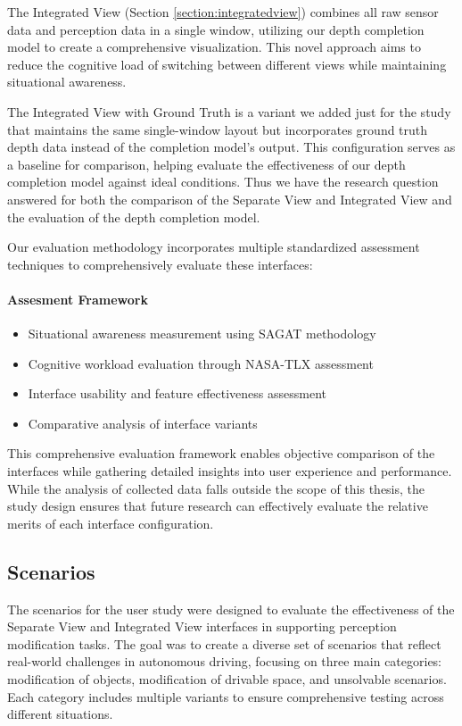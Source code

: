 The Integrated View (Section \ref{section:integratedview}) combines all raw sensor data and perception data in a single window, utilizing our depth completion model to create a comprehensive visualization. This novel approach aims to reduce the cognitive load of switching between different views while maintaining situational awareness.

The Integrated View with Ground Truth is a variant we added just for the study that maintains the same single-window layout but incorporates ground truth depth data instead of the completion model's output. This configuration serves as a baseline for comparison, helping evaluate the effectiveness of our depth completion model against ideal conditions.
Thus we have the research question answered for both the comparison of the Separate View and Integrated View and the evaluation of the depth completion model.

Our evaluation methodology incorporates multiple standardized assessment techniques to comprehensively evaluate these interfaces:

\paragraph{Assesment Framework}
\begin{itemize}
    \item Situational awareness measurement using \ac{SAGAT} \cite{endsley1988sagat} methodology
    \item Cognitive workload evaluation through \ac{NASA-TLX} \cite{hart2006nasa} assessment
    \item Interface usability and feature effectiveness assessment
    \item Comparative analysis of interface variants
\end{itemize}

This comprehensive evaluation framework enables objective comparison of the interfaces while gathering detailed insights into user experience and performance. While the analysis of collected data falls outside the scope of this thesis, the study design ensures that future research can effectively evaluate the relative merits of each interface configuration.

\subsection{Scenarios}
The scenarios for the user study were designed to evaluate the effectiveness of the Separate View and Integrated View interfaces in supporting perception modification tasks. The goal was to create a diverse set of scenarios that reflect real-world challenges in autonomous driving, focusing on three main categories: modification of objects, modification of drivable space, and unsolvable scenarios. Each category includes multiple variants to ensure comprehensive testing across different situations.
